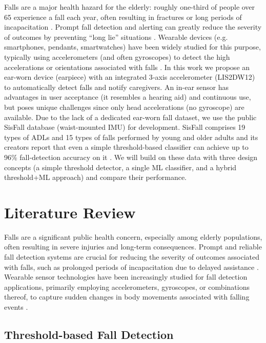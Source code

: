 \documentclass[conference]{IEEEtran}
\begin{document}
\noindent Falls are a major health hazard for the elderly: roughly one-third of people over 65 experience a fall each year, often resulting in fractures or long periods of incapacitation \cite{SisFall}.
Prompt fall detection and alerting can greatly reduce the severity of outcomes by preventing “long lie” situations \cite{SisFall,2}.
Wearable devices (e.g. smartphones, pendants, smartwatches) have been widely studied for this purpose, typically using accelerometers (and often gyroscopes) to detect the high accelerations or orientations associated with falls \cite{3,4}.
In this work we propose an ear-worn device (earpiece) with an integrated 3‑axis accelerometer (LIS2DW12) to automatically detect falls and notify caregivers. An in-ear sensor has advantages in user acceptance (it resembles a hearing aid) and continuous use, but poses unique challenges since only head accelerations (no gyroscope) are available.
Due to the lack of a dedicated ear-worn fall dataset, we use the public SisFall database (waist-mounted IMU) for development. SisFall comprises 19 types of ADLs and 15 types of falls performed by young and older adults \cite{SisFall} and its creators report that even a simple threshold-based classifier can achieve up to 96\% fall-detection accuracy on it \cite{SisFall}. We will build on these data with three design concepts (a simple threshold detector, a single ML classifier, and a hybrid threshold+ML approach) and compare their performance.


\section{Literature Review}

Falls are a significant public health concern, especially among elderly populations, often resulting in severe injuries and long-term consequences. Prompt and reliable fall detection systems are crucial for reducing the severity of outcomes associated with falls, such as prolonged periods of incapacitation due to delayed assistance \cite{SisFall,2}. Wearable sensor technologies have been increasingly studied for fall detection applications, primarily employing accelerometers, gyroscopes, or combinations thereof, to capture sudden changes in body movements associated with falling events \cite{3,4}.

\subsection{Threshold-based Fall Detection}
\end{document}
